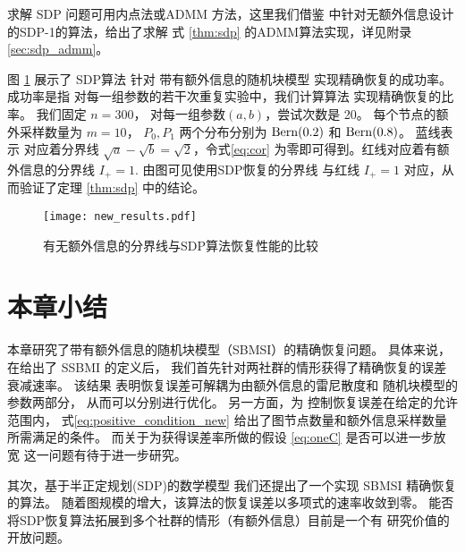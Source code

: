     求解 SDP 问题可用内点法或ADMM 方法，这里我们借鉴 \citet{amini2018semidefinite} 中针对无额外信息设计的SDP-1的算法，给出了求解
    式 \eqref{thm:sdp} 的ADMM算法实现，详见附录\ref{sec:sdp_admm}。

    图 \ref{fig:my_label} 展示了 SDP算法
    针对 带有额外信息的随机块模型 实现精确恢复的成功率。
    成功率是指 对每一组参数的若干次重复实验中，我们计算算法
    实现精确恢复的比率。
    我们固定 $n=300$， 对每一组参数$(a,b)$，尝试次数是 20。
    每个节点的额外采样数量为 $m=10$，
    $P_0,P_1$ 两个分布分别为 $\operatorname{Bern}(0.2)$ 和 $\operatorname{Bern}(0.8)$。
    蓝线表示 对应着分界线 $\sqrt{a}-\sqrt{b}=\sqrt{2}$，令式\eqref{eq:cor}
    为零即可得到。红线对应着有额外信息的分界线 $I_+ = 1$.
    由图可见使用SDP恢复的分界线 与红线 $I_+ = 1$ 对应，从而验证了定理
    \ref{thm:sdp} 中的结论。
    \begin{figure}[!ht]
        \centering
        \texttt{[image: new\_results.pdf]}
        \caption{有无额外信息的分界线与SDP算法恢复性能的比较}
        \label{fig:my_label}
    \end{figure}

\section{本章小结}
本章研究了带有额外信息的随机块模型（SBMSI）的精确恢复问题。
具体来说，在给出了 SSBMI 的定义后， 
我们首先针对两社群的情形获得了精确恢复的误差衰减速率。
该结果
表明恢复误差可解耦为由额外信息的雷尼散度和
随机块模型的参数两部分，
从而可以分别进行优化。
另一方面，为
控制恢复误差在给定的允许范围内，
式\eqref{eq:positive_condition_new}
给出了图节点数量和额外信息采样数量所需满足的条件。
而关于为获得误差率所做的假设 \eqref{eq:oneC} 是否可以进一步放宽
这一问题有待于进一步研究。

其次，基于半正定规划(SDP)的数学模型
我们还提出了一个实现 SBMSI 精确恢复的算法。
随着图规模的增大，该算法的恢复误差以多项式的速率收敛到零。
能否将SDP恢复算法拓展到多个社群的情形（有额外信息）目前是一个有
研究价值的开放问题。

